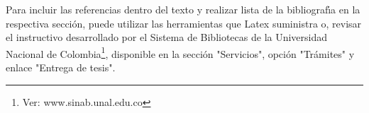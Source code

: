 \begin{appendix}
Para incluir las referencias dentro del texto y realizar lista de la bibliograf\'{\i}a en la respectiva secci\'{o}n, puede utilizar las herramientas que Latex suministra o, revisar el instructivo desarrollado por el Sistema de Bibliotecas de la Universidad Nacional de Colombia\footnote{Ver: www.sinab.unal.edu.co}, disponible en la secci\'{o}n "Servicios", opci\'{o}n "Tr\'{a}mites" y enlace "Entrega de tesis".

\end{appendix}